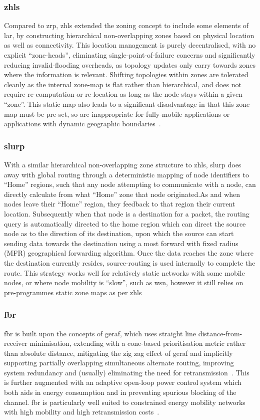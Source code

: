 {\subsubsection{\gls{zhls}}
Compared to \gls{zrp}, \gls{zhls} extended the zoning concept to include some elements of \gls{lar}, by constructing hierarchical non-overlapping zones based on physical location as well as connectivity. This location management is purely decentralised, with no explicit ``zone-heads'', eliminating single-point-of-failure concerns and significantly reducing invalid-flooding overheads, as topology updates only carry towards zones where the information is relevant. Shifting topologies within zones are tolerated cleanly as the internal zone-map is flat rather than hierarchical, and does not require re-computation or re-location as long as the node stays within a given ``zone''. This static map also leads to a significant disadvantage in that this zone-map must be pre-set, so are inappropriate for fully-mobile applications or applications with dynamic geographic boundaries~\cite{Joa-Ng1999,Hamma2006}.
\subsubsection{\gls{slurp}}
With a similar hierarchical non-overlapping zone structure to \gls{zhls}, \gls{slurp} does away with global routing through a deterministic mapping of node identifiers to ``Home'' regions, such that any node attempting to communicate with a node, can directly calculate from what ``Home'' zone that node originated.As and when nodes leave their ``Home'' region, they feedback to that region their current location. Subsequently when that node is a destination for a packet, the routing query is automatically directed to the home region which can direct the source node as to the direction of its destination, upon which the source can start sending data towards the destination using a most forward with fixed radius (MFR) geographical forwarding algorithm. Once the data reaches the zone where the destination currently resides, source-routing is used internally to complete the route. This strategy works well for relatively static networks with some mobile nodes, or where node mobility is ``slow'', such as \gls{wsn}, however it still relies on pre-programmes static zone maps as per \gls{zhls}~\cite{Woo2001}
\subsubsection{\gls{fbr}}
\gls{fbr} is built upon the concepts of \gls{geraf}, which uses straight line distance-from-receiver minimisation, extending with a cone-based prioritisation metric rather than absolute distance, mitigating the zig zag effect of \gls{geraf} and implicitly supporting partially overlapping simultaneous alternate routing, improving system redundancy and (usually) eliminating the need for retransmission~\cite{Jornet2008}.
This is further augmented with an adaptive open-loop power control system which both aids in energy consumption and in preventing spurious blocking of the channel.
\gls{fbr} is particularly well suited to constrained energy mobility networks with high mobility and high retransmission costs~\cite{Noh2012}.

}

